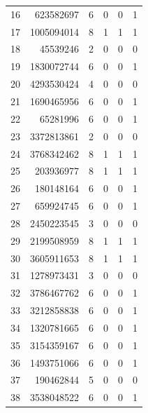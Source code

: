\begin{longtable}{rrrrrr}
16 & 623582697 & 6 & 0 & 0 & 1\\

17 & 1005094014 & 8 & 1 & 1 & 1\\

18 & 45539246 & 2 & 0 & 0 & 0\\

19 & 1830072744 & 6 & 0 & 0 & 1\\

20 & 4293530424 & 4 & 0 & 0 & 0\\

21 & 1690465956 & 6 & 0 & 0 & 1\\

22 & 65281996 & 6 & 0 & 0 & 1\\

23 & 3372813861 & 2 & 0 & 0 & 0\\

24 & 3768342462 & 8 & 1 & 1 & 1\\

25 & 203936977 & 8 & 1 & 1 & 1\\

26 & 180148164 & 6 & 0 & 0 & 1\\

27 & 659924745 & 6 & 0 & 0 & 1\\

28 & 2450223545 & 3 & 0 & 0 & 0\\

29 & 2199508959 & 8 & 1 & 1 & 1\\

30 & 3605911653 & 8 & 1 & 1 & 1\\

31 & 1278973431 & 3 & 0 & 0 & 0\\

32 & 3786467762 & 6 & 0 & 0 & 1\\

33 & 3212858838 & 6 & 0 & 0 & 1\\

34 & 1320781665 & 6 & 0 & 0 & 1\\

35 & 3154359167 & 6 & 0 & 0 & 1\\

36 & 1493751066 & 6 & 0 & 0 & 1\\

37 & 190462844 & 5 & 0 & 0 & 0\\

38 & 3538048522 & 6 & 0 & 0 & 1\\


\end{longtable}
